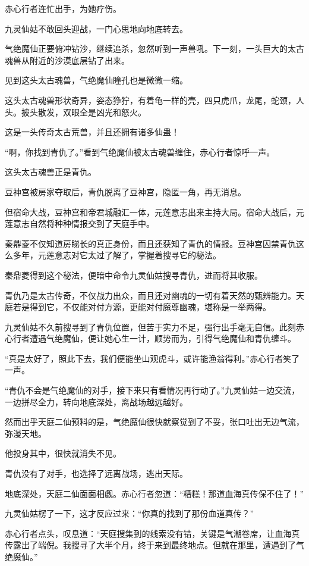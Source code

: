 \begin{this_body}
赤心行者连忙出手，为她疗伤。

九灵仙姑不敢回头迎战，一门心思地向地底转去。

气绝魔仙正要俯冲钻沙，继续追杀，忽然听到一声兽吼。下一刻，一头巨大的太古魂兽从附近的沙漠底层钻了出来。

见到这头太古魂兽，气绝魔仙瞳孔也是微微一缩。

这头太古魂兽形状奇异，姿态狰狞，有着龟一样的壳，四只虎爪，龙尾，蛇颈，人头。披头散发，双眼全是凶光和怒火。

这是一头传奇太古荒兽，并且还拥有诸多仙蛊！

“啊，你找到青仇了。”看到气绝魔仙被太古魂兽缠住，赤心行者惊呼一声。

这头太古魂兽正是青仇。

豆神宫被房家夺取后，青仇脱离了豆神宫，隐匿一角，再无消息。

但宿命大战，豆神宫和帝君城融汇一体，元莲意志出来主持大局。宿命大战后，元莲意志自然将种种情报交到了天庭手中。

秦鼎菱不仅知道房睇长的真正身份，而且还获知了青仇的情报。豆神宫囚禁青仇这么多年，元莲意志对它太过了解了，掌握着搜寻它的秘法。

秦鼎菱得到这个秘法，便暗中命令九灵仙姑搜寻青仇，进而将其收服。

青仇乃是太古传奇，不仅战力出众，而且还对幽魂的一切有着天然的甄辨能力。天庭若是得到它，不仅能对付方源，更能对付魔尊幽魂，堪称是一举两得。

九灵仙姑不久前搜寻到了青仇位置，但苦于实力不足，强行出手毫无自信。此刻赤心行者遭遇气绝魔仙，便让她心生一计，顺势而为，引得气绝魔仙和青仇缠斗。

“真是太好了，照此下去，我们便能坐山观虎斗，或许能渔翁得利。”赤心行者笑了一声。

“青仇不会是气绝魔仙的对手，接下来只有看情况再行动了。”九灵仙姑一边交流，一边拼尽全力，转向地底深处，离战场越远越好。

然而出乎天庭二仙预料的是，气绝魔仙很快就察觉到了不妥，张口吐出无边气流，弥漫天地。

他投身其中，很快就消失不见。

青仇没有了对手，也选择了远离战场，逃出天际。

地底深处，天庭二仙面面相觑。赤心行者忽道：“糟糕！那道血海真传保不住了！”

九灵仙姑楞了一下，这才反应过来：“你真的找到了那份血道真传？”

赤心行者点头，叹息道：“天庭搜集到的线索没有错，关键是气潮卷席，让血海真传露出了端倪。我搜寻了大半个月，终于来到最终地点。但就在那里，遭遇到了气绝魔仙。”


\end{this_body}
